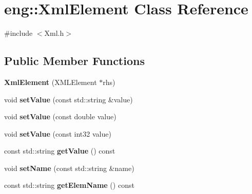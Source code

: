 \hypertarget{classeng_1_1_xml_element}{}\section{eng\+:\+:Xml\+Element Class Reference}
\label{classeng_1_1_xml_element}


{\ttfamily \#include $<$Xml.\+h$>$}

\subsection*{Public Member Functions}
\begin{DoxyCompactItemize}
\item 
\mbox{\label{classeng_1_1_xml_element_aa5d6d580352db5da1a58989084fc2c2d}} 
{\bfseries Xml\+Element} (X\+M\+L\+Element $\ast$rhs)
\item 
\mbox{\label{classeng_1_1_xml_element_aecffb2d9c194c2fbb87213176cefda0b}} 
void {\bfseries set\+Value} (const std\+::string \&value)
\item 
\mbox{\label{classeng_1_1_xml_element_a987091095d4e1f461739edb5b1565d7d}} 
void {\bfseries set\+Value} (const double value)
\item 
\mbox{\label{classeng_1_1_xml_element_a0e445baa631e2dce0cade742a9008ef6}} 
void {\bfseries set\+Value} (const int32 value)
\item 
\mbox{\label{classeng_1_1_xml_element_a280c2de45c58aef6daf1babd240423b7}} 
const std\+::string {\bfseries get\+Value} () const
\item 
\mbox{\label{classeng_1_1_xml_element_afaf40a52510d1d5b443ebb0c2938a552}} 
void {\bfseries set\+Name} (const std\+::string \&name)
\item 
\mbox{\label{classeng_1_1_xml_element_a65d1de88005f7f59e4ca20f1595d1afb}} 
const std\+::string {\bfseries get\+Elem\+Name} () const
\item 
\mbox{\label{classeng_1_1_xml_element_a68253afd7af7d8690cc22bc85c005308}} 

\end{DoxyCompactItemize}
